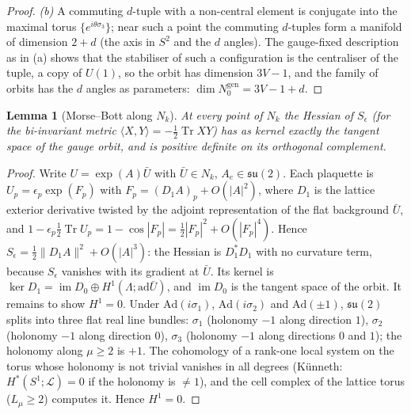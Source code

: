 \documentclass[11pt,a4paper]{article}
\theoremstyle{plain}
\newtheorem{lemma}[theorem]{Lemma}
\theoremstyle{definition}
\theoremstyle{remark}
\numberwithin{equation}{section}
\newcommand{\Tr}{\operatorname{Tr}}
\begin{document}
\begin{proof}
\emph{(b)} A commuting $d$-tuple with a non-central element is conjugate into the maximal torus $\{e^{i\theta\sigma_3}\}$; near such a point the commuting $d$-tuples form a manifold of dimension $2+d$ (the axis in $S^2$ and the $d$ angles). The gauge-fixed description as in (a) shows that the stabiliser of such a configuration is the centraliser of the tuple, a copy of $U(1)$, so the orbit has dimension $3V-1$, and the family of orbits has the $d$ angles as parameters: $\dim N_0^{\mathrm{gen}}=3V-1+d$.
\end{proof}

\begin{lemma}[Morse--Bott along $N_k$]\label{lem:B}
At every point of $N_k$ the Hessian of $S_\epsilon$ (for the bi-invariant metric $\langle X,Y\rangle=-\frac12\Tr XY$) has as kernel exactly the tangent space of the gauge orbit, and is positive definite on its orthogonal complement.
\end{lemma}
\begin{proof}
Write $U=\exp(A)\bar U$ with $\bar U\in N_k$, $A_e\in\mathfrak{su}(2)$. Each plaquette is $U_p=\epsilon_p\exp(F_p)$ with $F_p=(D_1A)_p+O(|A|^2)$, where $D_1$ is the lattice exterior derivative twisted by the adjoint representation of the flat background $\bar U$, and $1-\epsilon_p\frac12\Tr U_p=1-\cos|F_p|=\frac12|F_p|^2+O(|F_p|^4)$. Hence $S_\epsilon=\frac12\|D_1A\|^2+O(|A|^3)$: the Hessian is $D_1^*D_1$ with no curvature term, because $S_\epsilon$ vanishes with its gradient at $\bar U$. Its kernel is $\ker D_1=\operatorname{im}D_0\oplus H^1(\Lambda;\mathrm{ad}\bar U)$, and $\operatorname{im}D_0$ is the tangent space of the orbit. It remains to show $H^1=0$. Under $\mathrm{Ad}(i\sigma_1)$, $\mathrm{Ad}(i\sigma_2)$ and $\mathrm{Ad}(\pm1)$, $\mathfrak{su}(2)$ splits into three flat real line bundles: $\sigma_1$ (holonomy $-1$ along direction $1$), $\sigma_2$ (holonomy $-1$ along direction $0$), $\sigma_3$ (holonomy $-1$ along directions $0$ and $1$); the holonomy along $\mu\ge2$ is $+1$. The cohomology of a rank-one local system on the torus whose holonomy is not trivial vanishes in all degrees (K\"unneth: $H^*(S^1;\mathcal L)=0$ if the holonomy is $\ne1$), and the cell complex of the lattice torus ($L_\mu\ge2$) computes it. Hence $H^1=0$.
\end{proof}
\end{document}
